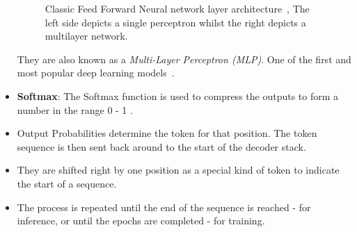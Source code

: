 \begin{itemize}
\begin{figure}[H]
		      \label{fig:feed_forward}
		      \caption{Classic Feed Forward Neural network layer architecture~\autocite{guptaDeepLearningFeedforward2018}, The left side depicts
			      a single perceptron whilst the right depicts a multilayer network.}
	      \end{figure}
	      They are also known as a \emph{Multi-Layer Perceptron (MLP)}. One of the first and most popular deep learning models~\autocite{FeedforwardNeuralNetwork2022}.
	\item \textbf{Softmax}: The Softmax function is used to compress the outputs to form a number in the range 0 - 1 .
	\item Output Probabilities determine the token for that position. The token sequence is then sent back around to the start of the decoder stack.
	\item They are shifted right by one position as a special kind of token to indicate the start of a sequence.
	\item The process is repeated until the end of the sequence is reached - for inference, or until the epochs are completed - for training.
\end{itemize}

